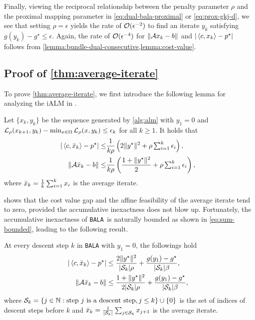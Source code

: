 \documentclass[11pt]{article}
\newcommand{\alg}{\texttt{BALA}}%
\begin{document}
    Finally, viewing the reciprocal relationship between the penalty parameter $\rho$ and the proximal mapping parameter in \cref{eq:dual-bala-proximal} or \eqref{eq:prox-gkj-d}, we see that setting $\rho = \epsilon$ yields the rate of $\mathcal{O}(\epsilon^{-2})$ to find an iterate $y_k$ satisfying $g(y_k) - g^\star \leq \epsilon$. Again, the rate of $\mathcal{O}(\epsilon^{-4})$ for $\|\mathcal{A} x_{k} - b\|$ and $|\left \langle c, x_{k} \right\rangle - p^\star|$ follows from \cref{lemma:bundle-dual-consecutive,lemma:cost-value}.
    



    
\subsection{Proof of \cref{thm:average-iterate}}
\label{apx:thm:average-iterate}
To prove \cref{thm:average-iterate}, we first introduce the following lemma for analyzing the iALM in \cite{xu2021iteration}.


\begin{lemma} 
    \label{lemma:egrotic-rate}
    Let $\{x_k,y_k\}$ be the sequence generated by \cref{alg:alm} with $y_1 = 0$ and $\mathcal{L}_{\rho}(x_{k+1},y_k) - \min_{x \in \Omega} \mathcal{L}_{\rho}(x,y_k) \leq \epsilon_k$ for all $k \geq 1$. It holds that
    \begin{align*}
        |\left \langle c, \Bar{x}_k \right\rangle - p^\star |  \leq &  \frac{1}{k \rho} \left( 2 \|y^\star \|^2 + \rho \textstyle\sum_{i = 1}^k \epsilon_i \right), \\
        \|\mathcal{A} \Bar{x}_k - b \| \leq &  \frac{1}{k \rho} \left ( \frac{1 + \|y^\star \|^2}{2} +   \rho  \textstyle\sum_{i = 1}^k \epsilon_i\right ),
    \end{align*}
    where $ \Bar{x}_k = \frac{1}{k}\sum_{i=1}^{k} x_i$ is the average iterate.
\end{lemma}

 shows that the cost value gap and the affine feasibility of the average iterate tend to zero, provided the accumulative inexactness does not blow up. Fortunately, the accumulative inexactness of \alg~is naturally bounded as shown in \cref{eq:sum-bounded}, leading to the following result.  

\begin{corollary}
    \label{cor:primal-average} 
    At every descent step $k$ in \alg{} with $y_1 = 0$, the followings hold
    \begin{align*}
        |\left \langle c, \Bar{x}_k \right\rangle - p^\star | & \leq \frac{2 \|y^\star \|^2}{|\mathcal{S}_k|\rho}   +  \frac{g(y_1) - g^\star }{ |\mathcal{S}_k|\beta}, \\
        \|\mathcal{A}  \Bar{x}_k - b\| &  \leq \frac{1 + \|y^\star\|^2}{ 2 |\mathcal{S}_k| \rho}  + \frac{g(y_1) - g^\star }{ |\mathcal{S}_k| \beta},
    \end{align*}
    where $\mathcal{S}_k = \{ j \in \mathbb{N} :\text{step } j \text{ is a descent step}, j \leq k \} \cup \{0\}$ is the set of indices of descent steps before $k$ and $\Bar{x}_k = \frac{1}{|\mathcal{S}_k|} \sum_{j \in \mathcal{S}_k } x_{j+1}$ is the average iterate.
\end{corollary}
\end{document}
